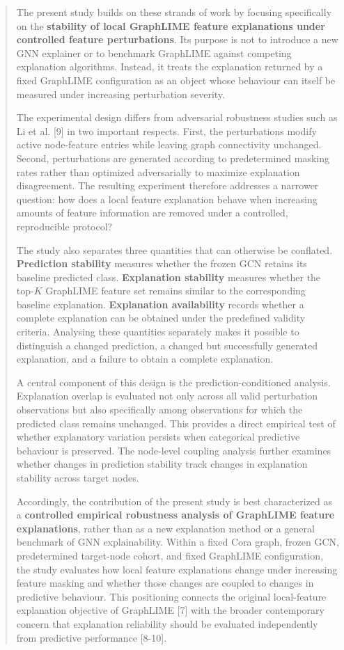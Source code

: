 \documentclass[a4paper]{article}
\begin{document}
\begin{quote}
The present study builds on these strands of work by focusing
specifically on the \textbf{stability of local GraphLIME feature
explanations under controlled feature perturbations}. Its purpose is not
to introduce a new GNN explainer or to benchmark GraphLIME against
competing explanation algorithms. Instead, it treats the explanation
returned by a fixed GraphLIME configuration as an object whose behaviour
can itself be measured under increasing perturbation severity.

The experimental design differs from adversarial robustness studies such
as Li et al. {[}9{]} in two important respects. First, the perturbations
modify active node-feature entries while leaving graph connectivity
unchanged. Second, perturbations are generated according to
predetermined masking rates rather than optimized adversarially to
maximize explanation disagreement. The resulting experiment therefore
addresses a narrower question: how does a local feature explanation
behave when increasing amounts of feature information are removed under
a controlled, reproducible protocol?

The study also separates three quantities that can otherwise be
conflated. \textbf{Prediction stability} measures whether the frozen GCN
retains its baseline predicted class. \textbf{Explanation stability}
measures whether the top-\(K\) GraphLIME feature set remains similar to
the corresponding baseline explanation. \textbf{Explanation
availability} records whether a complete explanation can be obtained
under the predefined validity criteria. Analysing these quantities
separately makes it possible to distinguish a changed prediction, a
changed but successfully generated explanation, and a failure to obtain
a complete explanation.

A central component of this design is the prediction-conditioned
analysis. Explanation overlap is evaluated not only across all valid
perturbation observations but also specifically among observations for
which the predicted class remains unchanged. This provides a direct
empirical test of whether explanatory variation persists when
categorical predictive behaviour is preserved. The node-level coupling
analysis further examines whether changes in prediction stability track
changes in explanation stability across target nodes.

Accordingly, the contribution of the present study is best characterized
as a \textbf{controlled empirical robustness analysis of GraphLIME
feature explanations}, rather than as a new explanation method or a
general benchmark of GNN explainability. Within a fixed Cora graph,
frozen GCN, predetermined target-node cohort, and fixed GraphLIME
configuration, the study evaluates how local feature explanations change
under increasing feature masking and whether those changes are coupled
to changes in predictive behaviour. This positioning connects the
original local-feature explanation objective of GraphLIME {[}7{]} with
the broader contemporary concern that explanation reliability should be
evaluated independently from predictive performance {[}8-10{]}.
\end{quote}
\end{document}
